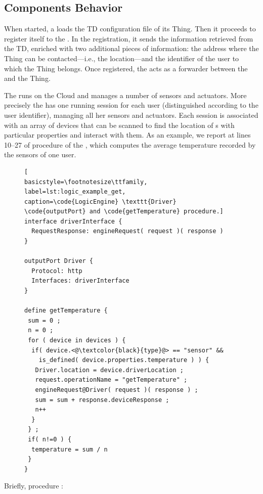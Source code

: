 %


\subsection{Components Behavior}

When started, a  loads the TD configuration file of its Thing.
Then it proceeds to register itself to the . In the
registration, it sends the information retrieved from the TD, enriched with two
additional pieces of information: the address where the Thing can be
contacted---i.e., the  location---and the identifier of the
user to which the Thing belongs. Once registered, the  acts as
a forwarder between the  and the Thing. 

The  runs on the Cloud and manages a number of sensors and
actuators. More precisely the  has one running session for
each user (distinguished according to the user identifier), managing all her
sensors and actuators. Each session is associated with an array of devices
that can be scanned to find the location of s with particular
properties and interact with them. As an example, we report at lines 10--27 of
 procedure  of the
, which computes the average temperature recorded by the
sensors of one user.
%
\begin{figure}[b]
\begin{lstlisting}[
basicstyle=\footnotesize\ttfamily,
label=lst:logic_example_get,
caption=\code{LogicEngine} \texttt{Driver} \code{outputPort} and \code{getTemperature} procedure.]
interface driverInterface {
  RequestResponse: engineRequest( request )( response )
}

outputPort Driver {
  Protocol: http
  Interfaces: driverInterface
}

define getTemperature {
 sum = 0 ; 
 n = 0 ;
 for ( device in devices ) {
  if( device.<@\textcolor{black}{type}@> == "sensor" && 
    is_defined( device.properties.temperature ) ) {
   Driver.location = device.driverLocation ; 
   request.operationName = "getTemperature" ;
   engineRequest@Driver( request )( response ) ;
   sum = sum + response.deviceResponse ; 
   n++ 
  }
 } ; 
 if( n!=0 ) {
  temperature = sum / n
 } 
}
\end{lstlisting}
\end{figure}
%
Briefly, procedure : 

